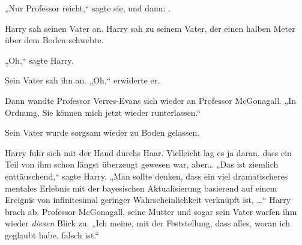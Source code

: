 „Nur Professor reicht,“ sagte sie, und dann: .

Harry sah seinen Vater an.
Harry sah zu seinem Vater, der einen halben Meter über dem Boden schwebte.

„Oh,“ sagte Harry.

Sein Vater sah ihn an. „Oh,“ erwiderte er.

Dann wandte Professor Verres-Evans sich wieder an Professor McGonagall. „In Ordnung, Sie können mich jetzt wieder runterlassen.“

Sein Vater wurde sorgsam wieder zu Boden gelassen.

Harry fuhr sich mit der Hand durchs Haar. Vielleicht lag es ja daran, dass ein Teil von ihm schon längst überzeugt gewesen war, aber… „Das ist ziemlich enttäuschend,“ sagte Harry. „Man sollte denken, dass ein viel dramatischeres mentales Erlebnis mit der bayesischen Aktualisierung basierend auf einem Ereignis von infinitesimal geringer Wahrscheinlichkeit verknüpft ist, …“ Harry brach ab. Professor McGonagall, seine Mutter und sogar sein Vater warfen ihm wieder \emph{diesen} Blick zu. „Ich meine, mit der Feststellung, dass alles, woran ich geglaubt habe, falsch ist.“

